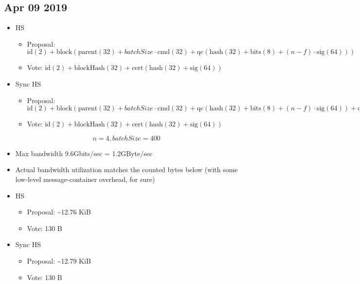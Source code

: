 \documentclass{article}
\begin{document}
\newcommand{\bsize}{\mathit{batchSize}}
\begin{landscape}
\section{Apr 09 2019}
\begin{center}
\footnotesize
\begin{itemize}
    \item HS
\begin{itemize}
    \item Proposal: $\textrm{id}(2) + \textrm{block}(\textrm{parent}(32) + \bsize \cdot \textrm{cmd}(32) + \textrm{qc}(\textrm{hash}(32) + \textrm{bits}(8) + (n - f) \cdot \textrm{sig}(64)))$
    \item Vote: $\textrm{id}(2) + \textrm{blockHash}(32) + \textrm{cert}(\textrm{hash}(32) + \textrm{sig}(64))$
\end{itemize}
    \item Sync HS
\begin{itemize}
    \item Proposal: $\textrm{id}(2) + \textrm{block}(\textrm{parent}(32) + \bsize \cdot \textrm{cmd}(32) + \textrm{qc}(\textrm{hash}(32) + \textrm{bits}(8) + (n - f) \cdot \textrm{sig}(64)) + \textrm{qcRefHash}(32))$
    \item Vote: $\textrm{id}(2) + \textrm{blockHash}(32) + \textrm{cert}(\textrm{hash}(32) + \textrm{sig}(64))$
\end{itemize}
\end{itemize}
\[n = 4, \bsize = 400\]
\begin{itemize}
    \item Max bandwidth 9.6Gbits/sec = 1.2GByte/sec
    \item Actual bandwidth utilization matches the counted bytes below (with some low-level message-container overhead, for sure)
\end{itemize}
\begin{itemize}
    \item HS
\begin{itemize}
    \item Proposal: \textasciitilde12.76 KiB
    \item Vote: 130 B
\end{itemize}
    \item Sync HS
\begin{itemize}
    \item Proposal: \textasciitilde12.79 KiB
    \item Vote: 130 B
\end{itemize}
\end{itemize}


\end{center}
\end{landscape}
\end{document}
